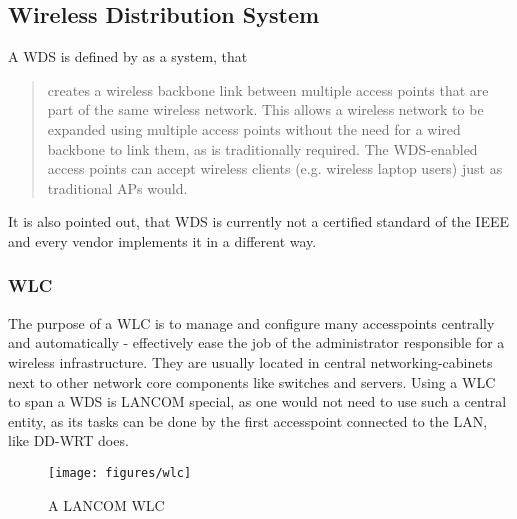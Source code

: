 \newpage
	      
    \subsection{Wireless Distribution System}
      A \ac{WDS} is defined by \cite{dd_wrt} as a system, that
      
      \begin{quote}
	creates a wireless backbone link between multiple access points that are part of the same wireless network. 
	This allows a wireless network to be expanded using multiple access points without the need for a wired backbone to link them, as is traditionally required. 
	The WDS-enabled access points can accept wireless clients (e.g. wireless laptop users) just as traditional APs would.
      \end{quote}

      It is also pointed out, that WDS is currently not a certified standard of the IEEE and every vendor implements it in a different way.      
      
      \subsubsection{\ac{WLC}}
	The purpose of a \ac{WLC} is to manage and configure many accesspoints centrally and automatically - effectively ease the job of the administrator responsible for a 
	wireless infrastructure. They are usually located in central networking-cabinets next to other network core components like switches and servers.
	Using a WLC to span a WDS is LANCOM special, as one would not need to use such a central entity, as its tasks can be done by the first accesspoint connected to the LAN,
	like DD-WRT does.
	
	\begin{figure}[h!]
	  \centering
	  \texttt{[image: figures/wlc]}
	  \caption{A LANCOM \ac{WLC}}
	  \label{fig:wlc}
	\end{figure}
	
	\newpage
      
